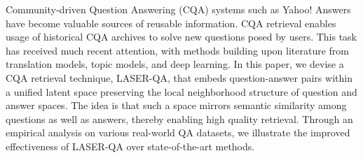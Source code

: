 Community-driven Question Answering (CQA) systems such as Yahoo! Answers have become valuable sources of reusable information. CQA retrieval enables usage of historical CQA archives to solve new questions posed by users. This task has received much recent attention, with methods building upon literature from translation models, topic models, and deep learning. In this paper, we devise a CQA retrieval technique, LASER-QA, that embeds question-answer pairs within a unified latent space preserving the local neighborhood structure of question and answer spaces. The idea is that such a space mirrors semantic similarity among questions as well as answers, thereby enabling high quality retrieval. Through an empirical analysis on various real-world QA datasets, we illustrate the improved effectiveness of LASER-QA over state-of-the-art methods.
